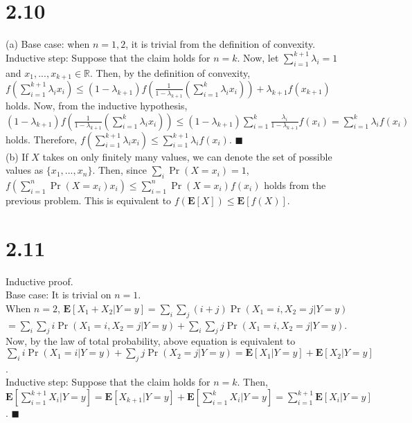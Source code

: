 \documentclass{article}
\begin{document}
\section*{2.10}
(a) Base case: when $n=1,2$, it is trivial from the definition of convexity.\\
Inductive step: Suppose that the claim holds for $n=k$.
Now, let $\sum\limits_{i=1}^{k+1}\lambda_i=1$ and $x_1,...,x_{k+1}\in \mathbb{R}$.
Then, by the definition of convexity,\\
$f(\sum\limits_{i=1}^{k+1}\lambda_ix_i)\leq(1-\lambda_{k+1})f(\frac{1}{1-\lambda_{k+1}}(\sum\limits_{i=1}^k\lambda_ix_i))+\lambda_{k+1}f(x_{k+1})$ holds.
Now, from the inductive hypothesis, $(1-\lambda_{k+1})f(\frac{1}{1-\lambda_{k+1}}(\sum\limits_{i=1}^k\lambda_ix_i))\leq(1-\lambda_{k+1})\sum\limits_{i=1}^k\frac{\lambda_i}{1-\lambda_{k+1}}f(x_i)=\sum\limits_{i=1}^{k}\lambda_if(x_i)$ holds.
Therefore, $f(\sum\limits_{i=1}^{k+1}\lambda_ix_i)\leq\sum\limits_{i=1}^{k+1}\lambda_if(x_i)$. $\blacksquare$\\
(b) If $X$ takes on only finitely many values, we can denote the set of possible values as $\{x_1,...,x_n\}$.
Then, since $\sum_i\Pr(X=x_i)=1$, $f(\sum\limits_{i=1}^n\Pr(X=x_i)x_i)\leq\sum\limits_{i=1}^n\Pr(X=x_i)f(x_i)$ holds from the previous problem.
This is equivalent to $f(\textbf{E}[X])\leq\textbf{E}[f(X)]$.
\section*{2.11}
Inductive proof.\\
Base case: It is trivial on $n=1$.\\
When $n=2$, $\textbf{E}[X_1+X_2|Y=y]=\sum\limits_i\sum\limits_j(i+j)\Pr(X_1=i,X_2=j|Y=y)$\\
$=\sum\limits_i\sum\limits_ji\Pr(X_1=i,X_2=j|Y=y)+\sum\limits_i\sum\limits_jj\Pr(X_1=i,X_2=j|Y=y)$.\\
Now, by the law of total probability, above equation is equivalent to\\
$\sum\limits_i i\Pr(X_1=i|Y=y)+\sum\limits_j j\Pr(X_2=j|Y=y)=\textbf{E}[X_1|Y=y]+\textbf{E}[X_2|Y=y]$.\\
Inductive step: Suppose that the claim holds for $n=k$. Then,\\
$\textbf{E}[\sum\limits_{i=1}^{k+1}X_i|Y=y]=\textbf{E}[X_{k+1}|Y=y]+\textbf{E}[\sum\limits_{i=1}^kX_i|Y=y]=\sum\limits_{i=1}^{k+1}\textbf{E}[X_i|Y=y]$. $\blacksquare$
\end{document}
